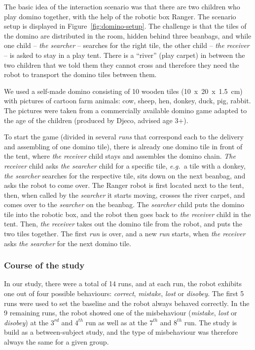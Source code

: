 \documentclass{sig-alternate}
\newcommand{\eg}{{\textit{e.g.~}}}
\begin{document}
The basic idea of the interaction scenario was that there are two children who
play domino together, with the help of the robotic box Ranger. The scenario
setup is displayed in Figure~\ref{fig:domino-setup}. The challenge is that the
tiles of the domino are distributed in the room, hidden behind three beanbags,
and while one child -- \textit{the searcher} -- searches for the right tile, the
other child -- \textit{the receiver} -- is asked to stay in a play tent. There
is a ``river'' (play carpet) in between the two children that we told them they
cannot cross and therefore they need the robot to transport the domino tiles
between them.

We used a self-made domino consisting of 10 wooden tiles (10~x~20~x~1.5~cm) with
pictures of cartoon farm animals: cow, sheep, hen, donkey, duck, pig, rabbit. The
pictures were taken from a commercially available domino game adapted to the age
of the children (produced by Djeco, advised age 3+). 

To start the game (divided in several \textit{runs} that correspond each to the
delivery and assembling of one domino tile), there is already one domino tile in
front of the tent, where \textit{the receiver} child stays and assembles the
domino chain. \textit{The receiver} child asks \textit{the searcher} child for a
specific tile, \eg a tile with a donkey, \textit{the searcher} searches for the
respective tile, sits down on the next beanbag, and asks the robot to come over.
The Ranger robot is first located next to the tent, then, when called by the
\textit{searcher} it starts moving, crosses the river carpet, and comes over to
the \textit{searcher} on the beanbag. The \textit{searcher} child puts the
domino tile into the robotic box, and the robot then goes back to \textit{the
receiver} child in the tent. Then, \textit{the receiver} takes out the domino
tile from the robot, and puts the two tiles together. The first \textit{run} is
over, and a new \textit{run} starts, when \textit{the receiver} asks \textit{the
searcher} for the next domino tile.

\subsubsection{Course of the study}

In our study, there were a total of 14 runs, and at each run, the robot exhibits
one out of four possible behaviours: \emph{correct}, \emph{mistake}, \emph{lost}
or \emph{disobey}.  The first 5 runs were used to set the baseline and the robot
always behaved correctly. In the 9 remaining runs, the robot showed one of the
misbehaviour (\emph{mistake}, \emph{lost} or \emph{disobey}) at the $3^{rd}$ and
$4^{th}$ run as well as at the $7^{th}$ and $8^{th}$ run. The study is build as
a between-subject study, and the type of misbehaviour was therefore always the
same for a given group.
\end{document}
